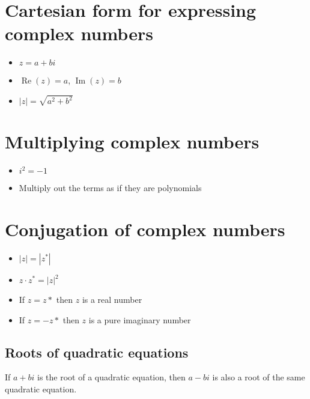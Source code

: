 \section{Cartesian form for expressing complex numbers}
\begin{itemize}
    \item $z=a+bi$
    \item $\operatorname{Re}(z) = a$, $\operatorname{Im}(z) = b$
    \item $|z|=\sqrt{a^2+b^2}$
\end{itemize}

\section{Multiplying complex numbers}
\begin{itemize}
    \item $i^2 = -1$
    \item Multiply out the terms as if they are polynomials
\end{itemize}

\section{Conjugation of complex numbers}
\begin{itemize}
    \item $|z|=|z^*|$
    \item $z\cdot z^*= |z|^2$
    \item If $z=z*$ then $z$ is a real number
    \item If $z=-z*$ then $z$ is a pure imaginary number
\end{itemize}
\subsection{Roots of quadratic equations}
If $a+bi$ is the root of a quadratic equation, then $a-bi$ is also a root of the same quadratic equation.